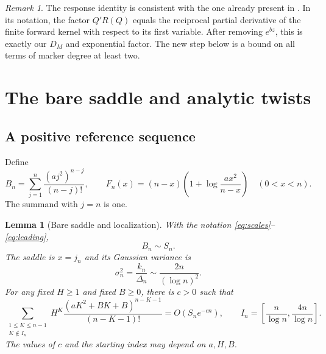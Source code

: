 \documentclass[11pt,a4paper]{article}
\numberwithin{equation}{section}
\newtheorem{lemma}[theorem]{Lemma}
\theoremstyle{definition}
\theoremstyle{remark}
\newtheorem{remark}[theorem]{Remark}
\begin{document}
\begin{remark}
The response identity is consistent with the one already present in
\cite{finitecore}. In its notation, the factor $Q'R(Q)$ equals the
reciprocal partial derivative of the finite forward kernel with respect to
its first variable. After removing $e^{bz}$, this is exactly our $D_M$
and exponential factor. The new step below is a bound on all terms of
marker degree at least two.
\end{remark}

\section{The bare saddle and analytic twists}
\label{sec:saddle}

\subsection{A positive reference sequence}

Define
\begin{equation}
 B_n=\sum_{j=1}^{n}\frac{(a j^2)^{n-j}}{(n-j)!},\qquad
 F_n(x)=(n-x)\left(1+\log\frac{a x^2}{n-x}\right)
 \quad(0<x<n).
 \label{eq:bare}
\end{equation}
The summand with $j=n$ is one.

\begin{lemma}[Bare saddle and localization]
\label{lem:bare}
With the notation \eqref{eq:scales}--\eqref{eq:leading},
\begin{equation}
 B_n\sim S_n.
 \label{eq:bare-equivalent}
\end{equation}
The saddle is $x=j_n$ and its Gaussian variance is
\begin{equation}
 \sigma_n^2=\frac{k_n}{\Delta_n}
 \sim\frac{2n}{(\log n)^2}.
 \label{eq:bare-variance}
\end{equation}
For any fixed $H\ge1$ and fixed $B\ge0$, there is $c>0$ such that
\begin{equation}
 \sum_{\substack{1\le K\le n-1\\K\notin I_n}}
 H^K\frac{(aK^2+BK+B)^{n-K-1}}{(n-K-1)!}
 =O(S_n e^{-cn}),\qquad
 I_n=\left[\frac n{\log n},\frac{4n}{\log n}\right].
 \label{eq:macro}
\end{equation}
The values of $c$ and the starting index may depend on $a,H,B$.
\end{lemma}
\end{document}
